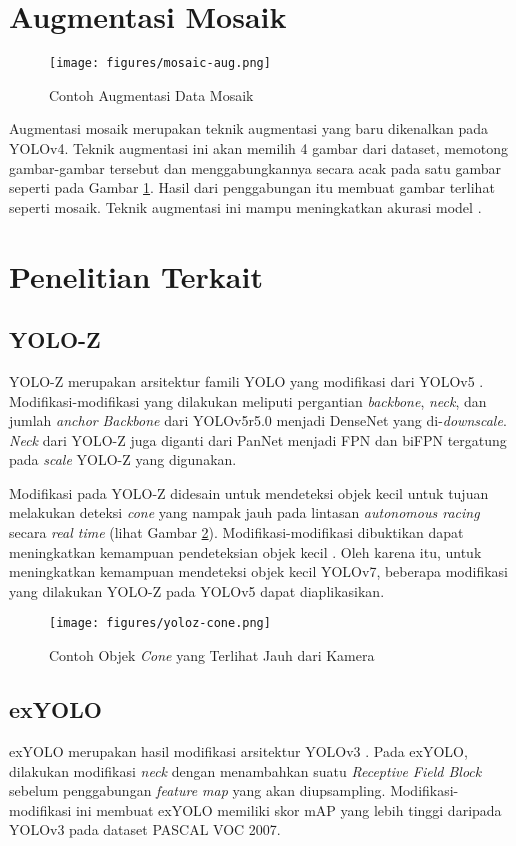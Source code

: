 \section{Augmentasi Mosaik}
\label{section:mosaic_study}
  \begin{figure}[H]
    \centering
    \texttt{[image: figures/mosaic-aug.png]}
    \caption{Contoh Augmentasi Data Mosaik \parencite{yolov5}}
    \label{fig:mosaic}
  \end{figure}

  Augmentasi mosaik merupakan teknik augmentasi yang baru dikenalkan pada YOLOv4.
  Teknik augmentasi ini akan memilih 4 gambar dari dataset, memotong gambar-gambar tersebut dan menggabungkannya secara acak pada satu gambar seperti pada Gambar \ref{fig:mosaic}.
  Hasil dari penggabungan itu membuat gambar terlihat seperti mosaik.
  Teknik augmentasi ini mampu meningkatkan akurasi model \parencite{yolov4}.


\section{Penelitian Terkait}
\label{section:relatedwork}

  \subsection{YOLO-Z}
    YOLO-Z merupakan arsitektur famili YOLO yang modifikasi dari YOLOv5 \parencite{yoloz}.
    Modifikasi-modifikasi yang dilakukan meliputi pergantian \emph{backbone}, \emph{neck}, dan jumlah \emph{anchor}
    \emph{Backbone} dari YOLOv5r5.0 menjadi DenseNet yang di-\emph{downscale}.
    \emph{Neck} dari YOLO-Z juga diganti dari PanNet menjadi FPN dan biFPN tergatung pada \emph{scale} YOLO-Z yang digunakan.

    Modifikasi pada YOLO-Z didesain untuk mendeteksi objek kecil untuk tujuan melakukan deteksi \emph{cone} yang nampak jauh pada lintasan \emph{autonomous racing} secara \emph{real time} (lihat Gambar \ref{fig:yolozcone}).
    Modifikasi-modifikasi dibuktikan dapat meningkatkan kemampuan pendeteksian objek kecil \parencite{yoloz}.
    Oleh karena itu, untuk meningkatkan kemampuan mendeteksi objek kecil YOLOv7, beberapa modifikasi yang dilakukan YOLO-Z pada YOLOv5 dapat diaplikasikan.
    \begin{figure}[H]
      \centering
      \texttt{[image: figures/yoloz-cone.png]}
      \caption{Contoh Objek \emph{Cone} yang Terlihat Jauh dari Kamera}
      \label{fig:yolozcone}
    \end{figure}

  \subsection{exYOLO}
    exYOLO merupakan hasil modifikasi arsitektur YOLOv3 \parencite{exyolo}.
    Pada exYOLO, dilakukan modifikasi \emph{neck} dengan menambahkan suatu \emph{Receptive Field Block} sebelum penggabungan \emph{feature map} yang akan diupsampling.
    Modifikasi-modifikasi ini membuat exYOLO memiliki skor mAP yang lebih tinggi daripada YOLOv3 pada dataset PASCAL VOC 2007.